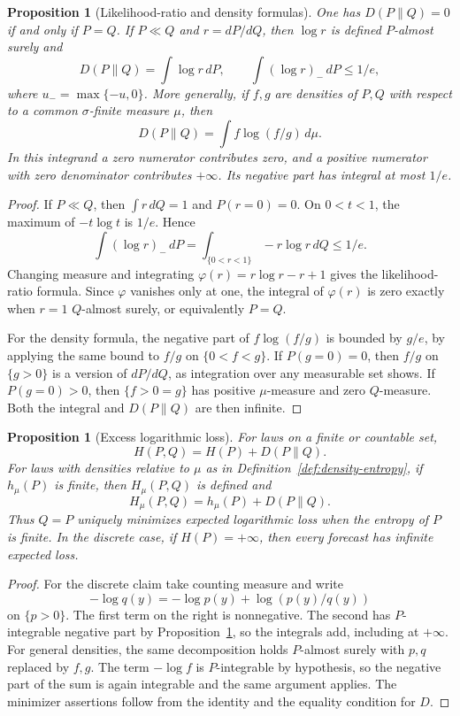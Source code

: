\documentclass[11pt,oneside]{book}
\newtheorem{proposition}[theorem]{Proposition}
\theoremstyle{definition}
\theoremstyle{remark}
\begin{document}
\begin{proposition}[Likelihood-ratio and density formulas]
\label{prop:relative-entropy-density}
One has $D(P\|Q)=0$ if and only if $P=Q$. If $P\ll Q$ and
$r=dP/dQ$, then $\log r$ is defined $P$-almost surely and
\[
D(P\|Q)=\int\log r\,dP,\qquad \int(\log r)_-\,dP\leq 1/e,
\]
where $u_-=\max\{-u,0\}$. More generally, if $f,g$ are densities of
$P,Q$ with respect to a common $\sigma$-finite measure $\mu$, then
\[
D(P\|Q)=\int f\log(f/g)\,d\mu .
\]
In this integrand a zero numerator contributes zero, and a positive
numerator with zero denominator contributes $+\infty$. Its negative
part has integral at most $1/e$.
\end{proposition}
\begin{proof}
If $P\ll Q$, then $\int r\,dQ=1$ and $P(r=0)=0$.
On $0<t<1$, the maximum of $-t\log t$ is $1/e$. Hence
\[
\int(\log r)_-\,dP
=\int_{\{0<r<1\}}-r\log r\,dQ\leq 1/e.
\]
Changing measure and integrating $\varphi(r)=r\log r-r+1$
gives the likelihood-ratio formula. Since $\varphi$ vanishes only at
one, the integral of $\varphi(r)$ is zero exactly when $r=1$
$Q$-almost surely, or equivalently $P=Q$.

For the density formula, the negative part of $f\log(f/g)$ is
bounded by $g/e$, by applying the same bound to $f/g$ on
$\{0<f<g\}$. If $P(g=0)=0$, then $f/g$ on $\{g>0\}$ is a
version of $dP/dQ$, as integration over any measurable set shows.
If $P(g=0)>0$, then $\{f>0=g\}$ has positive $\mu$-measure and
zero $Q$-measure. Both the integral and $D(P\|Q)$ are then infinite.
\end{proof}

\begin{proposition}[Excess logarithmic loss]
\label{prop:relative-entropy-cross-entropy}
For laws on a finite or countable set,
\[
H(P,Q)=H(P)+D(P\|Q).
\]
For laws with densities relative to $\mu$ as in
Definition~\ref{def:density-entropy}, if $h_\mu(P)$ is finite, then
$H_\mu(P,Q)$ is defined and
\[
H_\mu(P,Q)=h_\mu(P)+D(P\|Q).
\]
Thus $Q=P$ uniquely minimizes expected logarithmic loss when the
entropy of $P$ is finite. In the discrete case, if $H(P)=+\infty$,
then every forecast has infinite expected loss.
\end{proposition}
\begin{proof}
For the discrete claim take counting measure and write
\[
-\log q(y)=-\log p(y)+\log(p(y)/q(y))
\]
on $\{p>0\}$. The first term on the right is nonnegative.
The second has $P$-integrable negative part by
Proposition~\ref{prop:relative-entropy-density}, so the integrals add,
including at $+\infty$. For general densities, the same decomposition
holds $P$-almost surely with $p,q$ replaced by $f,g$. The term
$-\log f$ is $P$-integrable by hypothesis, so the negative part of
the sum is again integrable and the same argument applies.
The minimizer assertions follow from the identity and the equality
condition for $D$.
\end{proof}
\end{document}
